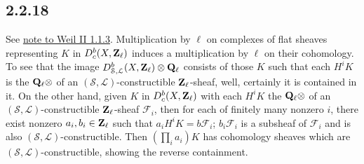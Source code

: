 \documentclass[deligne.tex]{subfiles}
\begin{document}
\subsection*{2.2.18}\label{BBD:2.2.18}
See \hyperref[weilII:1.1.3]{note to Weil II 1.1.3}.
Multiplication by $\ell$ on complexes of flat sheaves representing $K$
in $D_c^b(X,\mathbf{Z}_\ell)$ induces a multiplication by $\ell$ on their 
cohomology. To see that the image 
$D^b_{\mathcal S,\mathcal L}(X,\mathbf{Z}_\ell)\otimes\mathbf{Q}_\ell$
consists of those $K$ such that each $H^iK$ is the $\mathbf{Q}_\ell\otimes$
of an $(\mathcal S,\mathcal L)$-constructible $\mathbf{Z}_\ell$-sheaf, well,
certainly it is contained in it. On the other hand, given $K$ in
$D_c^b(X,\mathbf{Z}_\ell)$
with each $H^iK$ the $\mathbf{Q}_\ell\otimes$ of an
$(\mathcal S,\mathcal L)$-constructible $\mathbf{Z}_\ell$-sheaf $\mathscr F_i$,
then for each of finitely many nonzero $i$, there exist nonzero 
$a_i,b_i\in\mathbf{Z}_\ell$ such that $a_iH^iK=b\mathscr F_i$; $b_i\mathscr F_i$ is
a subsheaf of $\mathscr F_i$ and is also
$(\mathcal S,\mathcal L)$-constructible.
Then $(\prod_i a_i)K$ has cohomology sheaves which are
$(\mathcal S,\mathcal L)$-constructible, showing the reverse containment.
\end{document}
